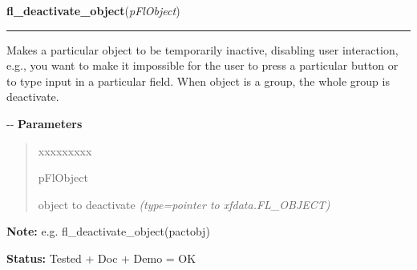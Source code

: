 \hspace{.8\funcindent}\begin{boxedminipage}{\funcwidth}

    \raggedright \textbf{fl\_deactivate\_object}(\textit{pFlObject})

    \vspace{-1.5ex}

    \rule{\textwidth}{0.5\fboxrule}
\setlength{\parskip}{2ex}

Makes a particular object to be temporarily inactive, disabling user
interaction, e.g., you want to make it impossible for the user to press a
particular button or to type input in a particular field. When object is a
group, the whole group is deactivate.

-{}-
\setlength{\parskip}{1ex}
      \textbf{Parameters}
      \vspace{-1ex}

      \begin{quote}
        \begin{Ventry}{xxxxxxxxx}

          \item[pFlObject]


object to deactivate
            {\it (type=pointer to xfdata.FL\_OBJECT)}

        \end{Ventry}

      \end{quote}

\textbf{Note:} 
e.g. fl\_deactivate\_object(pactobj)


\textbf{Status:} 
Tested + Doc + Demo = OK


    \end{boxedminipage}

    \label{xformslib:flbasic:fl_object_is_active}

    \vspace{0.5ex}

